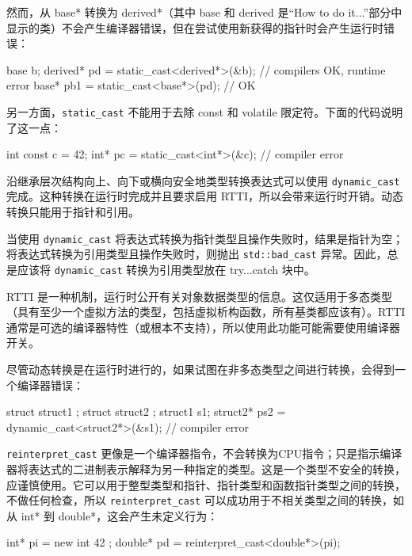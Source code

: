然而，从 base* 转换为 derived*（其中 base 和 derived 是“How to do it...”部分中显示的类）不会产生编译器错误，但在尝试使用新获得的指针时会产生运行时错误：

\begin{cpp}
base b;
derived* pd = static_cast<derived*>(&b); // compilers OK, runtime error
base* pb1 = static_cast<base*>(pd);      // OK
\end{cpp}

另一方面，\verb|static_cast| 不能用于去除 const 和 volatile 限定符。下面的代码说明了这一点：

\begin{cpp}
int const c = 42;
int* pc = static_cast<int*>(&c);         // compiler error
\end{cpp}

沿继承层次结构向上、向下或横向安全地类型转换表达式可以使用 \verb|dynamic_cast| 完成。这种转换在运行时完成并且要求启用 RTTI，所以会带来运行时开销。动态转换只能用于指针和引用。

当使用 \verb|dynamic_cast| 将表达式转换为指针类型且操作失败时，结果是指针为空；将表达式转换为引用类型且操作失败时，则抛出 \verb|std::bad_cast| 异常。因此，总是应该将 \verb|dynamic_cast| 转换为引用类型放在 try...catch 块中。

\begin{myNotic}
RTTI 是一种机制，运行时公开有关对象数据类型的信息。这仅适用于多态类型（具有至少一个虚拟方法的类型，包括虚拟析构函数，所有基类都应该有）。RTTI 通常是可选的编译器特性（或根本不支持），所以使用此功能可能需要使用编译器开关。
\end{myNotic}

尽管动态转换是在运行时进行的，如果试图在非多态类型之间进行转换，会得到一个编译器错误：

\begin{cpp}
struct struct1 {};
struct struct2 {};
struct1 s1;
struct2* ps2 = dynamic_cast<struct2*>(&s1); // compiler error
\end{cpp}

\verb|reinterpret_cast| 更像是一个编译器指令，不会转换为CPU指令；只是指示编译器将表达式的二进制表示解释为另一种指定的类型。这是一个类型不安全的转换，应谨慎使用。它可以用于整型类型和指针、指针类型和函数指针类型之间的转换，不做任何检查，所以 \verb|reinterpret_cast| 可以成功用于不相关类型之间的转换，如从 int* 到 double*，这会产生未定义行为：

\begin{cpp}
int* pi = new int{ 42 };
double* pd = reinterpret_cast<double*>(pi);
\end{cpp}

